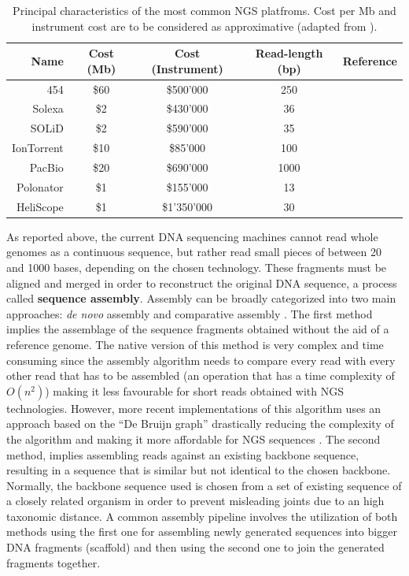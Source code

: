 \begin{table}
\centering
\scriptsize
\begin{tabular}{ r c c c c }
\hline
\textbf{Name} & \textbf{Cost (Mb)} & \textbf{Cost (Instrument)} & \textbf{Read-length (bp)} & \textbf{Reference} \\ \hline \hline
454 & \$60 & \$500'000 & 250 & \cite{margulies2005genome, dressman2003transforming} \\
Solexa & \$2 & \$430'000 & 36 & \cite{bentley2006whole, fedurco2006bta} \\
SOLiD & \$2 & \$590'000 & 35 & \cite{shendure2005accurate, mckernan2013reagents} \\
IonTorrent & \$10 & \$85'000 & 100 & \cite{merriman2012progress, quail2012tale} \\
PacBio & \$20 & \$690'000 & 1000 & \cite{zhang2012improving, quail2012tale} \\
Polonator & \$1 & \$155'000 & 13 & \cite{shendure2005accurate, dressman2003transforming} \\
HeliScope & \$1 & \$1'350'000 & 30 & \cite{harris2008single, braslavsky2003sequence} \\
\hline
\end{tabular}
\caption{Principal characteristics of the most common NGS platfroms. Cost per Mb and instrument cost are to be considered as approximative (adapted from \cite{shendure2008next}). \label{tab:ngs}}
\end{table}
As reported above, the current DNA sequencing machines cannot read whole genomes as a continuous sequence, but rather read small pieces of between 20 and 1000 bases, depending on the chosen technology. These fragments must be aligned and merged in order to reconstruct the original DNA sequence, a process called \textbf{sequence assembly}. Assembly can be broadly categorized into two main approaches: \textit{de novo} assembly and comparative assembly \cite{pop2009genome}. The first method implies the assemblage of the sequence fragments obtained without the aid of a reference genome. The native version of this method is very complex and time consuming since the assembly algorithm needs to compare every read with every other read that has to be assembled (an operation that has a time complexity of $O\left(n^2\right)$) making it less favourable for short reads obtained with NGS technologies. However, more recent implementations of this algorithm uses an approach based on the ``De Bruijn graph'' drastically reducing the complexity of the algorithm and making it more affordable for NGS sequences \cite{compeau2011apply}. The second method, implies assembling reads against an existing backbone sequence, resulting in a sequence that is similar but not identical to the chosen backbone. Normally, the backbone sequence used is chosen from a set of existing sequence of a closely related organism in order to prevent misleading joints due to an high taxonomic distance. A common assembly pipeline involves the utilization of both methods using the first one for assembling newly generated sequences into bigger DNA fragments (scaffold) and then using the second one to join the generated fragments together.\\
